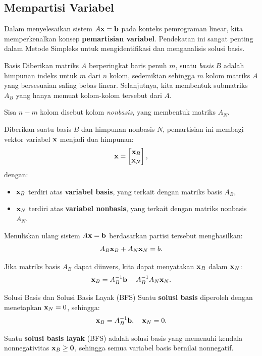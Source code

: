 \subsection{Mempartisi Variabel}

Dalam menyelesaikan sistem \( A\mathbf{x} =\mathbf{b}\) pada konteks pemrograman linear, kita memperkenalkan konsep \textbf{pemartisian variabel}. Pendekatan ini sangat penting dalam Metode Simpleks untuk mengidentifikasi dan menganalisis solusi basis.

\begin{definition}{Basis}{}
Diberikan matriks $A$ berperingkat baris penuh $m$, suatu \emph{basis} $B$ adalah himpunan indeks untuk $m$ dari $n$ kolom, sedemikian sehingga $m$ kolom matriks $A$ yang bersesuaian saling bebas linear.  Selanjutnya, kita membentuk submatriks $A_B$ yang hanya memuat kolom-kolom tersebut dari $A$. 

 Sisa \( n - m \) kolom disebut kolom \emph{nonbasis}, yang membentuk matriks \( A_N \). 
 \end{definition}
 
 Diberikan suatu basis $B$ dan himpunan nonbasis $N$, pemartisian ini membagi vektor variabel \( \mathbf{x} \) menjadi dua himpunan:
\[
\mathbf{x} =
\begin{bmatrix}
    \mathbf{x}_B \\ \mathbf{x}_N
\end{bmatrix},
\]
dengan:
\begin{itemize}
\item  \( \mathbf{x}_B \) terdiri atas \textbf{variabel basis}, yang terkait dengan matriks basis \( A_B \),
\item\( \mathbf{x}_N \) terdiri atas \textbf{variabel nonbasis}, yang terkait dengan matriks nonbasis \( A_N \).
\end{itemize}

Menuliskan ulang sistem \( A\mathbf{x} =\mathbf{b}\) berdasarkan partisi tersebut menghasilkan:
\begin{equation}
A_B \mathbf{x}_B + A_N \mathbf{x}_N = b.
\end{equation}

Jika matriks basis \( A_B \) dapat diinvers, kita dapat menyatakan \( \mathbf{x}_B \) dalam \( \mathbf{x}_N \):
\begin{equation}
\mathbf{x}_B = A_B^{-1}\mathbf{b}- A_B^{-1} A_N \mathbf{x}_N.
\end{equation}

\begin{definition}{Solusi Basis dan Solusi Basis Layak (BFS)}{}
Suatu \textbf{solusi basis} diperoleh dengan menetapkan \( \mathbf{x}_N = 0 \), sehingga:
\begin{equation}
\mathbf{x}_B = A_B^{-1} \mathbf{b}, \quad \mathbf{x}_N = 0.
\end{equation}

Suatu \textbf{solusi basis layak} (BFS) adalah solusi basis yang memenuhi kendala nonnegativitas \( \mathbf{x}_B \geq \mathbf{0} \), sehingga semua variabel basis bernilai nonnegatif.
\end{definition}
